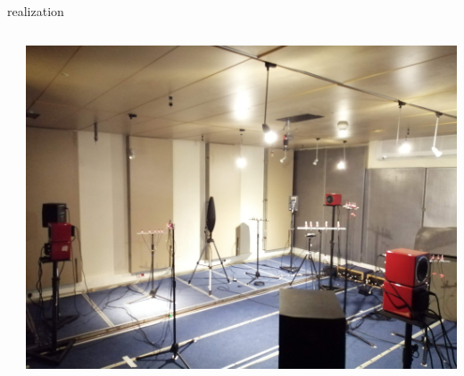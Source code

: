\begin{frame}[t]{\dechorate realization}
{\begin{columns}[T,onlytextwidth]
\begin{column}{0.3\textwidth}
            \end{column}\hfill
            \begin{column}{0.3\textwidth}
                \includegraphics[width=\textwidth]{figures/dechorate/panels}
            \end{column}
        \end{columns}
    }

\end{frame}


